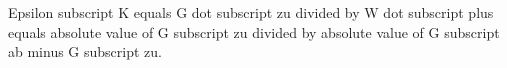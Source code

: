 Epsilon subscript K equals G dot subscript zu divided by W dot subscript plus equals absolute value of G subscript zu divided by absolute value of G subscript ab minus G subscript zu.